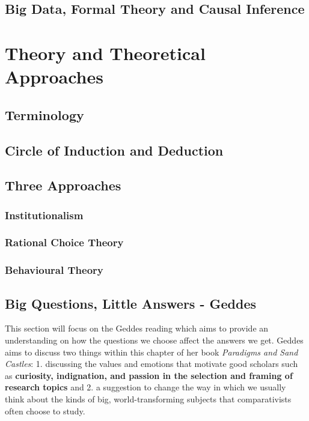 \documentclass[12pt, letterpaper]{article}
\begin{document}
{\subsection{Big Data, Formal Theory and Causal Inference}


\section{Theory and Theoretical Approaches}

\subsection{Terminology}

\subsection{Circle of Induction and Deduction}

\subsection{Three Approaches}

\subsubsection{Institutionalism}

\subsubsection{Rational Choice Theory}

\subsubsection{Behavioural Theory}

\subsection{Big Questions, Little Answers - Geddes}
This section will focus on the Geddes reading which aims to provide an understanding on how the questions we choose affect the answers we get. Geddes aims to discuss two things within this chapter of her book \textit{Paradigms and Sand Castles}: 1. discussing the values and emotions that motivate good scholars such as \textbf{curiosity, indignation, and passion in the selection and framing of research topics} and 2. a suggestion to change the way in which we usually think about the kinds of big, world-transforming subjects that comparativists often choose to study.

}
\end{document}
